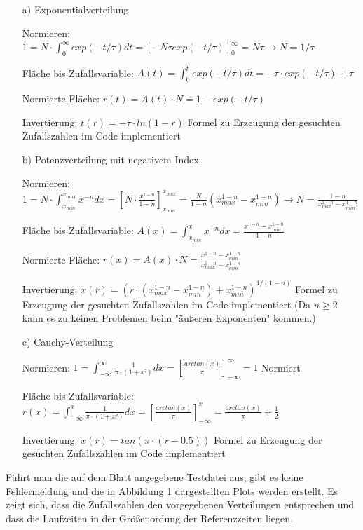 \documentclass[11pt,a4paper]{article}
\begin{document}
	\begin{itemize}
		\item[a)] Exponentialverteilung
		
		Normieren: $1 = N\cdot \int_0^{\infty} exp(-t/\tau)dt = [-N \tau exp(-t/\tau)]_0^{\infty} = N \tau 
					\to N = 1/\tau $
		
		Fläche bis Zufallsvariable: $A(t) = \int_0^{t} exp(-t/\tau)dt = - \tau \cdot exp(-t/\tau) + \tau $

		Normierte Fläche: $r(t) = A(t) \cdot N = 1 - exp(-t/\tau)$

		Invertierung: $t(r) = -\tau \cdot ln(1-r)$ \to Formel zu Erzeugung der gesuchten Zufallszahlen \to im Code implementiert


		\item[b)] Potenzverteilung mit negativem Index
		
		Normieren: $1 = N\cdot \int_{x_{min}}^{x_{max}} x^{-n}dx = [N \cdot \frac{x^{1-n}}{1-n}]_{x_{min}}^{x_{max}} = \frac{N}{1-n} (x_{max}^{1-n} - x_{min}^{1-n})
					\to N = \frac{1-n}{x_{max}^{1-n} - x_{min}^{1-n}} $
		
		Fläche bis Zufallsvariable: $A(x) = \int_{x_{min}}^{x} x^{-n}dx = \frac{x^{1-n} - x_{min}^{1-n}}{1-n} $

		Normierte Fläche: $r(x) = A(x) \cdot N = \frac{x^{1-n} - x_{min}^{1-n} }{x_{max}^{1-n} - x_{min}^{1-n}}$

		Invertierung: $x(r) = (r \cdot (x_{max}^{1-n} - x_{min}^{1-n}) + x_{min}^{1-n})^{1/(1-n)}$  
		\to Formel zu Erzeugung der gesuchten Zufallszahlen \to im Code implementiert (Da $n \geq 2$ kann es zu keinen Problemen beim "äußeren Exponenten" kommen.)

		\item[c)] Cauchy-Verteilung
		
		Normieren: $1 = \int_{-\infty}^{\infty} \frac{1}{\pi \cdot (1+x²)} dx = [\frac{arctan(x)}{\pi}]_{- \infty}^{\infty} = 1$ \to Normiert
		
		Fläche bis Zufallsvariable: $r(x) = \int_{-\infty}^{x} \frac{1}{\pi \cdot (1+x²)} dx = [\frac{arctan(x)}{\pi}]_{- \infty}^{x} = \frac{arctan(x)}{\pi} + \frac{1}{2}$

		Invertierung: $x(r) = tan(\pi \cdot (r - 0.5))$  
		\to Formel zu Erzeugung der gesuchten Zufallszahlen \to im Code implementiert 	
	\end{itemize}

	Führt man die auf dem Blatt angegebene Testdatei aus, gibt es keine Fehlermeldung und die in Abbildung 1 dargestellten
	Plots werden erstellt. Es zeigt sich, dass die Zufallszahlen den vorgegebenen Verteilungen entsprechen und dass die Laufzeiten
	in der Größenordung der Referenzzeiten liegen.
\end{document}
